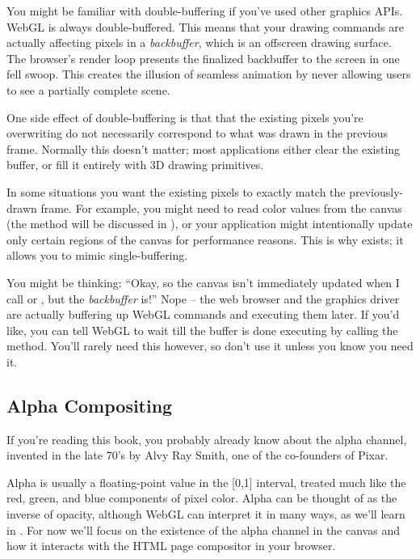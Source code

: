 You might be familiar with  double-buffering if you've used other graphics APIs.  WebGL is always double-buffered.  This means that your drawing commands are actually affecting pixels in a  \emph{backbuffer}, which is an offscreen drawing surface.  The browser's render loop presents the finalized backbuffer to the screen in one fell swoop.  This creates the illusion of seamless animation by never allowing users to see a partially complete scene.

One side effect of double-buffering is that that the existing pixels you're overwriting do not necessarily correspond to what was drawn in the previous frame.  Normally this doesn't matter; most applications either clear the existing buffer, or fill it entirely with 3D drawing primitives.

In some situations you want the existing pixels to exactly match the previously-drawn frame.  For example, you might need to read color values from the canvas (the   method will be discussed in ), or your application might intentionally update only certain regions of the canvas for performance reasons.  This is why  exists; it allows you to mimic  single-buffering.

You might be thinking: ``Okay, so the canvas isn't immediately updated when I call  or , but the \emph{backbuffer} is!''  Nope -- the web browser and the graphics driver are actually buffering up WebGL commands and executing them later.  If you'd like, you can tell WebGL to wait till the buffer is done executing by calling the   method.  You'll rarely need this however, so don't use it unless you know you need it.

\subsection{Alpha Compositing}

If you're reading this book, you probably already know about the alpha channel, invented in the late 70's by Alvy Ray Smith, one of the co-founders of Pixar.

Alpha is usually a floating-point value in the [0,1] interval, treated much like the red, green, and blue components of pixel color.  Alpha can be thought of as the inverse of opacity, although WebGL can interpret it in many ways, as we'll learn in .  For now we'll focus on the existence of the alpha channel in the canvas and how it interacts with the HTML page compositor in your browser.

